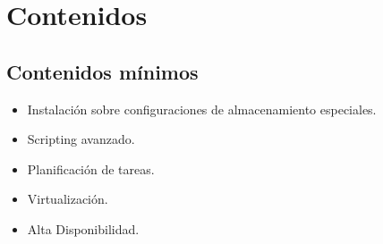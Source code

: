\section {Contenidos}
\subsection{Contenidos mínimos}
\begin{itemize}
	\item  Instalación sobre configuraciones de almacenamiento especiales. 
	\item  Scripting avanzado. 
	\item  Planificación de tareas. 
	\item  Virtualización. 
	\item  Alta Disponibilidad.
\end{itemize}


